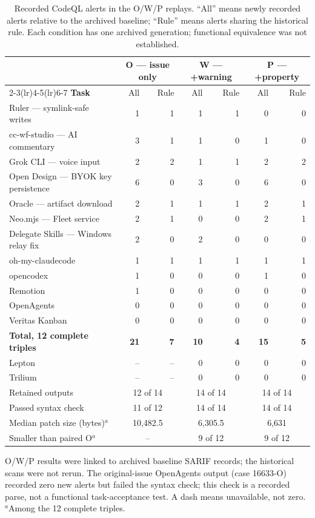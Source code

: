\begin{table}[H]
\caption{Recorded CodeQL alerts in the O/W/P replays. ``All'' means newly recorded alerts relative to the archived baseline; ``Rule'' means alerts sharing the historical rule. Each condition has one archived generation; functional equivalence was not established.}
\label{tab:replays}
\centering\small
\begin{tabular}{@{}lrrrrrr@{}}
\toprule
& \multicolumn{2}{c}{\textbf{O --- issue only}} & \multicolumn{2}{c}{\textbf{W --- +warning}} & \multicolumn{2}{c}{\textbf{P --- +property}}\\
\cmidrule(lr){2-3}\cmidrule(lr){4-5}\cmidrule(lr){6-7}
\textbf{Task} & All & Rule & All & Rule & All & Rule\\
\midrule
Ruler --- symlink-safe writes & 1 & 1 & 1 & 1 & 0 & 0\\
cc-wf-studio --- AI commentary & 3 & 1 & 1 & 0 & 1 & 0\\
Grok CLI --- voice input & 2 & 2 & 1 & 1 & 2 & 2\\
Open Design --- BYOK key persistence & 6 & 0 & 3 & 0 & 6 & 0\\
Oracle --- artifact download & 2 & 1 & 1 & 1 & 2 & 1\\
Neo.mjs --- Fleet service & 2 & 1 & 0 & 0 & 2 & 1\\
Delegate Skills --- Windows relay fix & 2 & 0 & 2 & 0 & 0 & 0\\
oh-my-claudecode & 1 & 1 & 1 & 1 & 1 & 1\\
opencodex & 1 & 0 & 0 & 0 & 1 & 0\\
Remotion & 1 & 0 & 0 & 0 & 0 & 0\\
OpenAgents & 0 & 0 & 0 & 0 & 0 & 0\\
Veritas Kanban & 0 & 0 & 0 & 0 & 0 & 0\\
\midrule
\textbf{Total, 12 complete triples} & \textbf{21} & \textbf{7} & \textbf{10} & \textbf{4} & \textbf{15} & \textbf{5}\\
Lepton & -- & -- & 0 & 0 & 0 & 0\\
Trilium & -- & -- & 0 & 0 & 0 & 0\\
\midrule
Retained outputs & \multicolumn{2}{c}{12 of 14} & \multicolumn{2}{c}{14 of 14} & \multicolumn{2}{c}{14 of 14}\\
Passed syntax check & \multicolumn{2}{c}{11 of 12} & \multicolumn{2}{c}{14 of 14} & \multicolumn{2}{c}{14 of 14}\\
Median patch size (bytes)$^a$ & \multicolumn{2}{c}{10,482.5} & \multicolumn{2}{c}{6,305.5} & \multicolumn{2}{c}{6,631}\\
Smaller than paired O$^a$ & \multicolumn{2}{c}{--} & \multicolumn{2}{c}{9 of 12} & \multicolumn{2}{c}{9 of 12}\\
\bottomrule
\end{tabular}
\par\smallskip\raggedright\footnotesize O/W/P results were linked to archived baseline SARIF records; the historical scans were not rerun. The original-issue OpenAgents output (case 16633-O) recorded zero new alerts but failed the syntax check; this check is a recorded parse, not a functional task-acceptance test. A dash means unavailable, not zero. $^a$Among the 12 complete triples.
\end{table}
